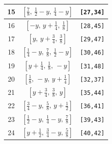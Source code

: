 \documentclass[fleqn,8pt]{jsarticle}
\begin{document}
\begin{longtable}{ccc}
15 & $\left[ \frac{7}{8},\, \frac{1}{2} - y,\, \frac{1}{4} - y \right]$ & {\tt [27,34]} \\ \hline
16 & $\left[ - y,\, y + \frac{1}{4},\, \frac{1}{8} \right]$ & {\tt [28,45]} \\ \hline
17 & $\left[ y,\, y + \frac{3}{4},\, \frac{3}{8} \right]$ & {\tt [29,47]} \\ \hline
18 & $\left[ \frac{1}{4} - y,\, \frac{7}{8},\, \frac{1}{2} - y \right]$ & {\tt [30,46]} \\ \hline
19 & $\left[ y + \frac{1}{4},\, \frac{1}{8},\, - y \right]$ & {\tt [31,48]} \\ \hline
20 & $\left[ \frac{1}{8},\, - y,\, y + \frac{1}{4} \right]$ & {\tt [32,37]} \\ \hline
21 & $\left[ y + \frac{3}{4},\, \frac{3}{8},\, y \right]$ & {\tt [35,44]} \\ \hline
22 & $\left[ \frac{3}{4} - y,\, \frac{5}{8},\, y + \frac{1}{2} \right]$ & {\tt [36,41]} \\ \hline
23 & $\left[ \frac{1}{2} - y,\, \frac{1}{4} - y,\, \frac{7}{8} \right]$ & {\tt [39,43]} \\ \hline
24 & $\left[ y + \frac{1}{2},\, \frac{3}{4} - y,\, \frac{5}{8} \right]$ & {\tt [40,42]} \\
\end{longtable}
\renewcommand{\arraystretch}{1.2}
\end{document}
